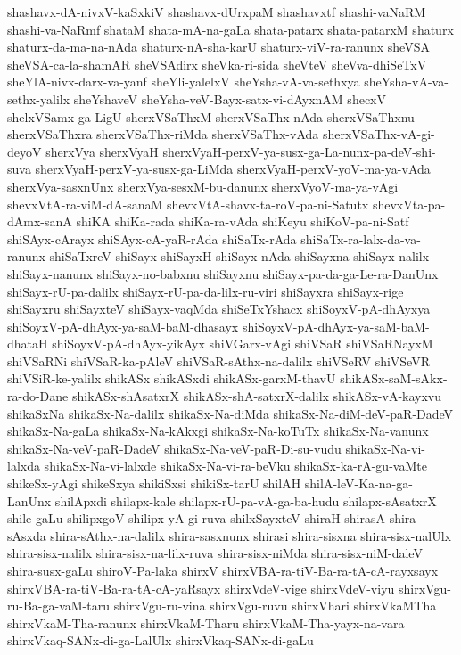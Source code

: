 {shashavx-dA-nivxV-kaSxkiV
shashavx-dUrxpaM
shashavxtf
shashi-vaNaRM
shashi-va-NaRmf
shataM
shata-mA-na-gaLa
shata-patarx
shata-patarxM
shaturx
shaturx-da-ma-na-nAda
shaturx-nA-sha-karU
shaturx-viV-ra-ranunx
sheVSA
sheVSA-ca-la-shamAR
sheVSAdirx
sheVka-ri-sida
sheVteV
sheVva-dhiSeTxV
sheYlA-nivx-darx-va-yanf
sheYli-yalelxV
sheYsha-vA-va-sethxya
sheYsha-vA-va-sethx-yalilx
sheYshaveV
sheYsha-veV-Bayx-satx-vi-dAyxnAM
shecxV
shelxVSamx-ga-LigU
sherxVSaThxM
sherxVSaThx-nAda
sherxVSaThxnu
sherxVSaThxra
sherxVSaThx-riMda
sherxVSaThx-vAda
sherxVSaThx-vA-gi-deyoV
sherxVya
sherxVyaH
sherxVyaH-perxV-ya-susx-ga-La-nunx-pa-deV-shi-suva
sherxVyaH-perxV-ya-susx-ga-LiMda
sherxVyaH-perxV-yoV-ma-ya-vAda
sherxVya-sasxnUnx
sherxVya-sesxM-bu-danunx
sherxVyoV-ma-ya-vAgi
shevxVtA-ra-viM-dA-sanaM
shevxVtA-shavx-ta-roV-pa-ni-Satutx
shevxVta-pa-dAmx-sanA
shiKA
shiKa-rada
shiKa-ra-vAda
shiKeyu
shiKoV-pa-ni-Satf
shiSAyx-cArayx
shiSAyx-cA-yaR-rAda
shiSaTx-rAda
shiSaTx-ra-lalx-da-va-ranunx
shiSaTxreV
shiSayx
shiSayxH
shiSayx-nAda
shiSayxna
shiSayx-nalilx
shiSayx-nanunx
shiSayx-no-babxnu
shiSayxnu
shiSayx-pa-da-ga-Le-ra-DanUnx
shiSayx-rU-pa-dalilx
shiSayx-rU-pa-da-lilx-ru-viri
shiSayxra
shiSayx-rige
shiSayxru
shiSayxteV
shiSayx-vaqMda
shiSeTxYshacx
shiSoyxV-pA-dhAyxya
shiSoyxV-pA-dhAyx-ya-saM-baM-dhasayx
shiSoyxV-pA-dhAyx-ya-saM-baM-dhataH
shiSoyxV-pA-dhAyx-yikAyx
shiVGarx-vAgi
shiVSaR
shiVSaRNayxM
shiVSaRNi
shiVSaR-ka-pAleV
shiVSaR-sAthx-na-dalilx
shiVSeRV
shiVSeVR
shiVSiR-ke-yalilx
shikASx
shikASxdi
shikASx-garxM-thavU
shikASx-saM-sAkx-ra-do-Dane
shikASx-shAsatxrX
shikASx-shA-satxrX-dalilx
shikASx-vA-kayxvu
shikaSxNa
shikaSx-Na-dalilx
shikaSx-Na-diMda
shikaSx-Na-diM-deV-paR-DadeV
shikaSx-Na-gaLa
shikaSx-Na-kAkxgi
shikaSx-Na-koTuTx
shikaSx-Na-vanunx
shikaSx-Na-veV-paR-DadeV
shikaSx-Na-veV-paR-Di-su-vudu
shikaSx-Na-vi-lalxda
shikaSx-Na-vi-lalxde
shikaSx-Na-vi-ra-beVku
shikaSx-ka-rA-gu-vaMte
shikeSx-yAgi
shikeSxya
shikiSxsi
shikiSx-tarU
shilAH
shilA-leV-Ka-na-ga-LanUnx
shilApxdi
shilapx-kale
shilapx-rU-pa-vA-ga-ba-hudu
shilapx-sAsatxrX
shile-gaLu
shilipxgoV
shilipx-yA-gi-ruva
shilxSayxteV
shiraH
shirasA
shira-sAsxda
shira-sAthx-na-dalilx
shira-sasxnunx
shirasi
shira-sisxna
shira-sisx-nalUlx
shira-sisx-nalilx
shira-sisx-na-lilx-ruva
shira-sisx-niMda
shira-sisx-niM-daleV
shira-susx-gaLu
shiroV-Pa-laka
shirxV
shirxVBA-ra-tiV-Ba-ra-tA-cA-rayxsayx
shirxVBA-ra-tiV-Ba-ra-tA-cA-yaRsayx
shirxVdeV-vige
shirxVdeV-viyu
shirxVgu-ru-Ba-ga-vaM-taru
shirxVgu-ru-vina
shirxVgu-ruvu
shirxVhari
shirxVkaMTha
shirxVkaM-Tha-ranunx
shirxVkaM-Tharu
shirxVkaM-Tha-yayx-na-vara
shirxVkaq-SANx-di-ga-LalUlx
shirxVkaq-SANx-di-gaLu
}
